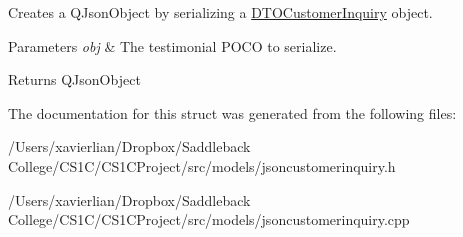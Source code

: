 Creates a Q\+Json\+Object by serializing a \mbox{\hyperlink{struct_d_t_o_customer_inquiry}{D\+T\+O\+Customer\+Inquiry}} object. 


\begin{DoxyParams}{Parameters}
{\em obj} & The testimonial P\+O\+CO to serialize. \\
\hline
\end{DoxyParams}
\begin{DoxyReturn}{Returns}
Q\+Json\+Object 
\end{DoxyReturn}


The documentation for this struct was generated from the following files\+:\begin{DoxyCompactItemize}
\item 
/\+Users/xavierlian/\+Dropbox/\+Saddleback College/\+C\+S1\+C/\+C\+S1\+C\+Project/src/models/jsoncustomerinquiry.\+h\item 
/\+Users/xavierlian/\+Dropbox/\+Saddleback College/\+C\+S1\+C/\+C\+S1\+C\+Project/src/models/jsoncustomerinquiry.\+cpp\end{DoxyCompactItemize}
